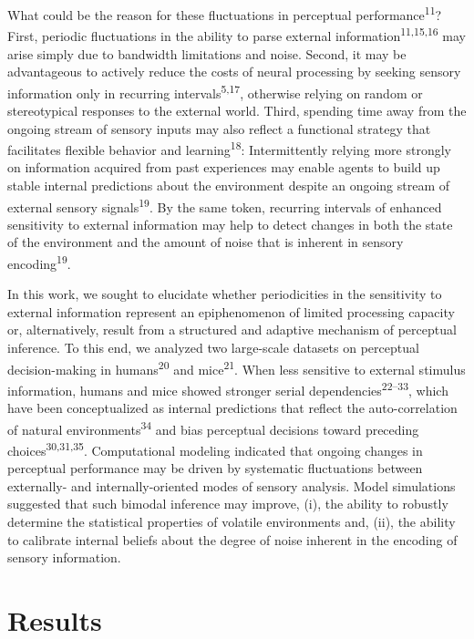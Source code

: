 \documentclass[
]{article}
\begin{document}
What could be the reason for these fluctuations in perceptual
performance\textsuperscript{11}? First, periodic fluctuations in the
ability to parse external information\textsuperscript{11,15,16} may
arise simply due to bandwidth limitations and noise. Second, it may be
advantageous to actively reduce the costs of neural processing by
seeking sensory information only in recurring
intervals\textsuperscript{5,17}, otherwise relying on random or
stereotypical responses to the external world. Third, spending time away
from the ongoing stream of sensory inputs may also reflect a functional
strategy that facilitates flexible behavior and
learning\textsuperscript{18}: Intermittently relying more strongly on
information acquired from past experiences may enable agents to build up
stable internal predictions about the environment despite an ongoing
stream of external sensory signals\textsuperscript{19}. By the same
token, recurring intervals of enhanced sensitivity to external
information may help to detect changes in both the state of the
environment and the amount of noise that is inherent in sensory
encoding\textsuperscript{19}.

In this work, we sought to elucidate whether periodicities in the
sensitivity to external information represent an epiphenomenon of
limited processing capacity or, alternatively, result from a structured
and adaptive mechanism of perceptual inference. To this end, we analyzed
two large-scale datasets on perceptual decision-making in
humans\textsuperscript{20} and mice\textsuperscript{21}. When less
sensitive to external stimulus information, humans and mice showed
stronger serial dependencies\textsuperscript{22--33}, which have been
conceptualized as internal predictions that reflect the auto-correlation
of natural environments\textsuperscript{34} and bias perceptual
decisions toward preceding choices\textsuperscript{30,31,35}.
Computational modeling indicated that ongoing changes in perceptual
performance may be driven by systematic fluctuations between externally-
and internally-oriented modes of sensory analysis. Model simulations
suggested that such bimodal inference may improve, (i), the ability to
robustly determine the statistical properties of volatile environments
and, (ii), the ability to calibrate internal beliefs about the degree of
noise inherent in the encoding of sensory information.

\hypertarget{results}{%
\section{Results}\label{results}}
\end{document}
